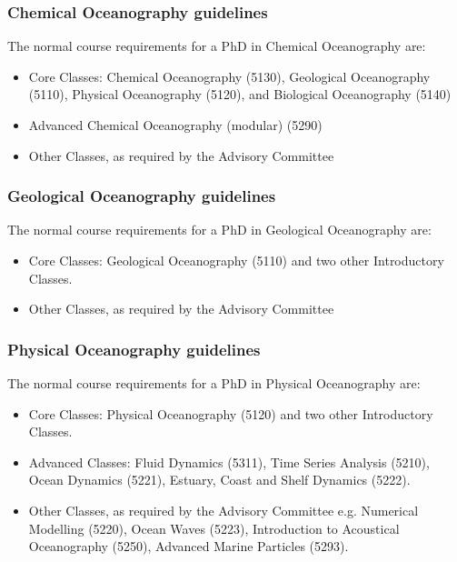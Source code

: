 \documentclass{article}
\begin{document}
\subsubsection{Chemical Oceanography guidelines}

The normal course requirements for a PhD in Chemical Oceanography are:

\begin{itemize}
\item Core Classes: Chemical Oceanography (5130), Geological Oceanography (5110), Physical Oceanography (5120), and Biological Oceanography (5140)
\item Advanced Chemical Oceanography (modular) (5290)
\item Other Classes, as required by the Advisory Committee
\end{itemize}

\subsubsection{Geological Oceanography guidelines}

The normal course requirements for a PhD in Geological Oceanography are:

\begin{itemize}
\item Core Classes: Geological Oceanography (5110) and two other Introductory Classes.
\item Other Classes, as required by the Advisory Committee
\end{itemize}

\subsubsection{Physical Oceanography guidelines}

The normal course requirements for a PhD in Physical Oceanography are:

\begin{itemize}
\item Core Classes: Physical Oceanography (5120) and two other Introductory Classes.
\item Advanced Classes: Fluid Dynamics (5311), Time Series Analysis (5210),
Ocean Dynamics (5221), Estuary, Coast and Shelf Dynamics (5222).
\item Other Classes, as required by the Advisory Committee e.g. Numerical
Modelling (5220), Ocean Waves (5223), Introduction to Acoustical Oceanography
(5250), Advanced Marine Particles (5293).
\end{itemize}
\end{document}
